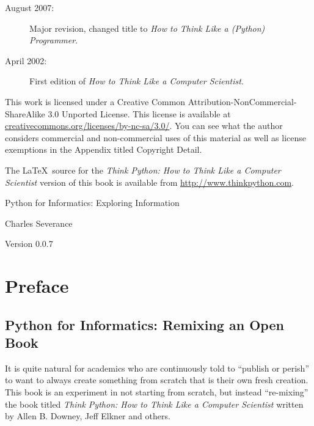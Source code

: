 \documentclass[11pt]{book}
\newcommand{\thetitle}{Python for Informatics: Exploring Information}
\newcommand{\theversion}{0.0.7}
\begin{document}
\begin{latexonly}
{\begin{description}
\item[August 2007:] Major revision, changed title to
\emph{How to Think Like a (Python) Programmer}.

\item[April 2002:] First edition of \emph{How to Think Like
a Computer Scientist}.

\end{description}

\vspace{0.2in}

This work is licensed under a 
Creative Common
Attribution-NonCommercial-ShareAlike 3.0 Unported License.
This license is 
available at
\url{creativecommons.org/licenses/by-nc-sa/3.0/}.  You can 
see what the author considers commercial and non-commercial
uses of this material as well as license exemptions 
in the Appendix titled Copyright Detail.

The \LaTeX\ source for the 
\emph{Think Python: How to Think Like
a Computer Scientist}
version of this book is available from
\url{http://www.thinkpython.com}.

\vspace{0.2in}

} %

\end{latexonly}



\begin{htmlonly}


{\Large \thetitle}

{\large 
Charles Severance}

Version \theversion

\setcounter{chapter}{-1}

\end{htmlonly}

\chapter{Preface}

\section*{Python for Informatics: Remixing an Open Book}

It is quite natural for academics who are continuously told to 
``publish or perish'' to want to always create something from scratch
that is their own fresh creation.   This book is an 
experiment in not starting from scratch, but instead ``re-mixing''
the book titled
\emph{Think Python: How to Think Like
a Computer Scientist}
written by Allen B. Downey, Jeff Elkner and others.
\end{document}
